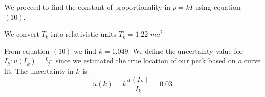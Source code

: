 \documentclass[10pt, a4paper]{article}
\begin{document}
\begin{multicols}{2}
We proceed to find the constant of proportionality in $p = kI$ using equation $(10)$.

We convert $T_k$ into relativistic units  $T_k = 1.22$ $mc^2$

From equation $(10)$ we find $k = 1.049$. We define the uncertainty value for $I_k: u(I_k) = \frac{0.1}{2}$ since we estimated the true location of our peak based on a curve fit. The uncertainty in $k$ is: 
\begin{equation} u(k) = k \frac{u(I_k)}{I_k} = 0.03
\end{equation} 















\end{multicols}


\end{document}
